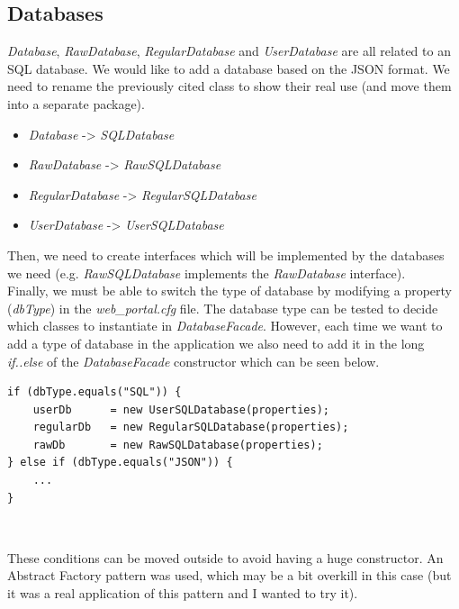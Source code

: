 \subsection{Databases}

\emph{Database}, \emph{RawDatabase}, \emph{RegularDatabase} and
\emph{UserDatabase} are all related to an SQL database. We would like to
add a database based on the JSON format. We need to rename the
previously cited class to show their real use (and move them into a
separate package).

\begin{itemize}
    \item \emph{Database} -> \emph{SQLDatabase}
    \item \emph{RawDatabase} -> \emph{RawSQLDatabase}
    \item \emph{RegularDatabase} -> \emph{RegularSQLDatabase}
    \item \emph{UserDatabase} -> \emph{UserSQLDatabase}
\end{itemize}

Then, we need to create interfaces which will be implemented by the databases we
need (e.g. \emph{RawSQLDatabase} implements the \emph{RawDatabase} interface).\\

Finally, we must be able to switch the type of database by modifying a property
(\emph{dbType}) in the \emph{web\_portal.cfg} file.
The database type can be tested to decide which classes to instantiate in
\emph{DatabaseFacade}. However, each time we want to add a type of
database in the application we also need to add it in the long \emph{if..else}
of the \emph{DatabaseFacade} constructor which can be seen below.\\

\begin{lstlisting}
if (dbType.equals("SQL")) {
	userDb		= new UserSQLDatabase(properties);
	regularDb	= new RegularSQLDatabase(properties);
	rawDb		= new RawSQLDatabase(properties);
} else if (dbType.equals("JSON")) {
    ...
}
\end{lstlisting}
\

These conditions can be moved outside to avoid having a huge constructor.
An Abstract Factory pattern was used, which may be a bit overkill in this case
(but it was a real application of this pattern and I wanted to try it).\\

